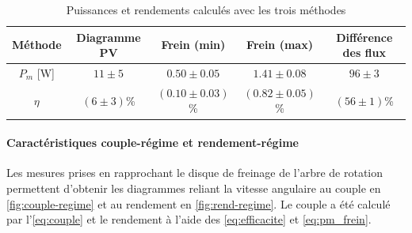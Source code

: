 \begin{table}[h]
    \centering
    \begin{tabulary}{\linewidth}{C C C C C}
        \toprule
        Méthode & Diagramme PV & Frein (min) & Frein (max) & Différence des flux \\
        \midrule
        \(P_m\) [\si{\watt}] & \(11 \pm 5\) & \(0.50 \pm 0.05\) & \(1.41 \pm 0.08\) & \(96 \pm 3\) \\
        \(\eta\) & \((6 \pm 3)\)\% & \((0.10 \pm 0.03)\)\% & \((0.82 \pm 0.05)\)\% & \((56 \pm 1)\)\% \\
        \bottomrule
    \end{tabulary}
    \caption{Puissances et rendements calculés avec les trois méthodes}
    \label{tab:pm_efficacite}
\end{table}

\paragraph*{Caractéristiques couple-régime et rendement-régime}
Les mesures prises en rapprochant le disque de freinage de l'arbre de rotation permettent d'obtenir les diagrammes reliant la vitesse angulaire au couple en \autoref{fig:couple-regime} et au rendement en \autoref{fig:rend-regime}. Le couple a été calculé par l'\autoref{eq:couple} et le rendement à l'aide des \autoref{eq:efficacite} et \autoref{eq:pm_frein}.

